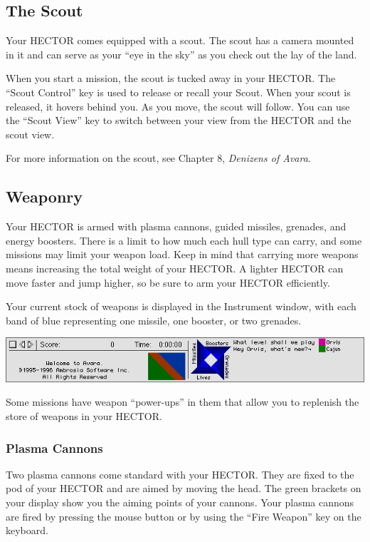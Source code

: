 \documentclass{article}
\begin{document}
\subsection{The Scout}
Your HECTOR comes equipped with a scout. The scout has a camera mounted in it and can serve as your ``eye in the sky'' as you check out the lay of the land.

When you start a mission, the scout is tucked away in your HECTOR. The ``Scout Control'' key is used to release or recall your Scout. When your scout is released, it hovers behind you. As you move, the scout will follow. You can use the ``Scout View'' key to switch between your view from the HECTOR and the scout view.

For more information on the scout, see Chapter 8, \textit{Denizens of Avara}.

\subsection{Weaponry}
Your HECTOR is armed with plasma cannons, guided missiles, grenades, and energy boosters. There is a limit to how much each hull type can carry, and some missions may limit your weapon load. Keep in mind that carrying more weapons means increasing the total weight of your HECTOR. A lighter HECTOR can move faster and jump higher, so be sure to arm your HECTOR efficiently.

Your current stock of weapons is displayed in the Instrument window, with each band of blue representing one missile, one booster, or two grenades.

\begin{center}
	\includegraphics[width=\textwidth]{img/07.png}
\end{center}

Some missions have weapon ``power-ups'' in them that allow you to replenish the store of weapons in your HECTOR.

\subsubsection{Plasma Cannons}
Two plasma cannons come standard with your HECTOR. They are fixed to the pod of your HECTOR and are aimed by moving the head. The green brackets on your display show you the aiming points of your cannons. Your plasma cannons are fired by pressing the mouse button or by using the ``Fire Weapon'' key on the keyboard.
\end{document}
